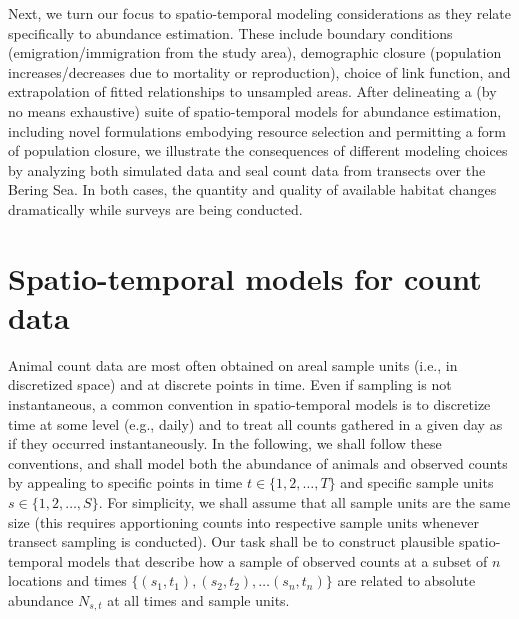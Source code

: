 \documentclass[12pt,english]{article}
\begin{document}
\begin{spacing}{1.9}
Next, we turn our focus to spatio-temporal modeling considerations as they relate specifically to abundance estimation.  These include boundary conditions (emigration/immigration from the study area), demographic closure (population increases/decreases due to mortality or reproduction), choice of link function, and extrapolation of fitted relationships to unsampled areas. After delineating a (by no means exhaustive) suite of spatio-temporal models for abundance estimation, including novel formulations embodying resource selection and permitting a form of population closure, we illustrate the consequences of different modeling choices by analyzing both simulated data and seal count data from transects over the Bering Sea. In both cases, the quantity and quality of available habitat changes dramatically while surveys are being conducted.

\section{Spatio-temporal models for count data}

Animal count data are most often obtained on areal sample units (i.e., in discretized space) and at discrete points in time.  Even if sampling is not instantaneous, a common convention in spatio-temporal models is to discretize time at some level (e.g., daily) and to treat all counts gathered in a given day as if they occurred instantaneously. In the following, we shall follow these conventions, and shall model both the abundance of animals and observed counts by appealing to specific points in time $t \in  \{ 1,2,\hdots,T \} $ and specific sample units $s \in \{ 1,2,\hdots,S \}$.  For simplicity, we shall assume that all sample units are the same size (this requires apportioning counts into respective sample units whenever transect sampling is conducted).  Our task shall be to construct plausible spatio-temporal models that describe how a sample of observed counts at a subset of $n$ locations and times $\{ (s_1,t_1),(s_2,t_2),\hdots (s_n,t_n) \}$ are related to absolute abundance $N_{s,t}$ at all times and sample units.


\end{spacing}
\end{document}
